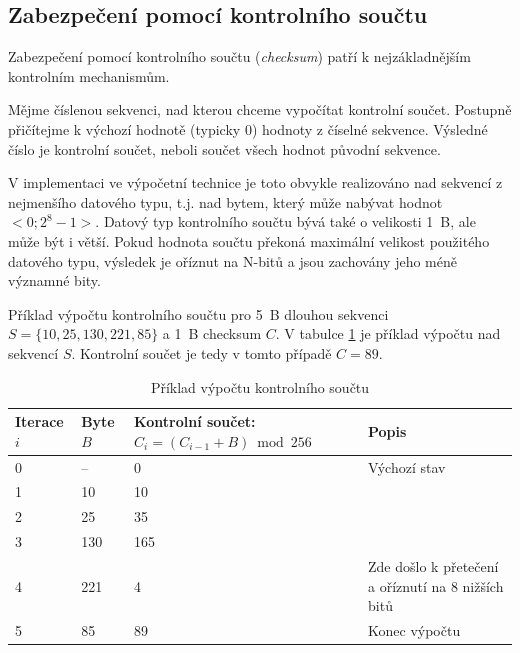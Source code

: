 \subsection{Zabezpečení pomocí kontrolního součtu}
\label{subsec:checksum}
Zabezpečení pomocí kontrolního součtu (\textit{checksum}) patří k nejzákladnějším kontrolním mechanismům.

Mějme číslenou sekvenci, nad kterou chceme vypočítat kontrolní součet. Postupně přičítejme k výchozí hodnotě (typicky 0) hodnoty z číselné sekvence. Výsledné číslo je kontrolní součet, neboli součet všech hodnot původní sekvence.

V implementaci ve výpočetní technice je toto obvykle realizováno nad sekvencí z nejmenšího datového typu, t.j. nad bytem, který může nabývat hodnot $<0;2^{8}-1>$. Datový typ kontrolního součtu bývá také o velikosti 1~B, ale může být i větší. Pokud hodnota součtu překoná maximální velikost použitého datového typu, výsledek je oříznut na N-bitů a jsou zachovány jeho méně významné bity.

Příklad výpočtu kontrolního součtu pro 5~B dlouhou sekvenci $S=\{10, 25, 130, 221, 85\}$ a 1~B checksum $C$.
V tabulce \ref{tab:checksum-example} je příklad výpočtu nad sekvencí $S$. Kontrolní součet je tedy v tomto případě $C=89$.
\begin{table}[h]
    \centering
    \begin{tabular}{ | l | l | l | l | }
        \hline
        Iterace $i$ & Byte $B$  & \makecell{Kontrolní součet:\\$C_{i}=(C_{i-1}+B) \bmod 256$}  & Popis \\ \hline\hline
        0           & --        & 0                                 & Výchozí stav \\ \hline
        1           & 10        & 10                                & \\\hline
        2           & 25        & 35                                & \\\hline
        3           & 130       & 165                               & \\\hline
        4           & 221       & 4                                 & Zde došlo k přetečení a oříznutí na 8 nižších bitů \\\hline
        5           & 85        & 89                                & Konec výpočtu \\\hline
    \end{tabular}
    \label{tab:checksum-example}
    \caption{Příklad výpočtu kontrolního součtu}
\end{table}

